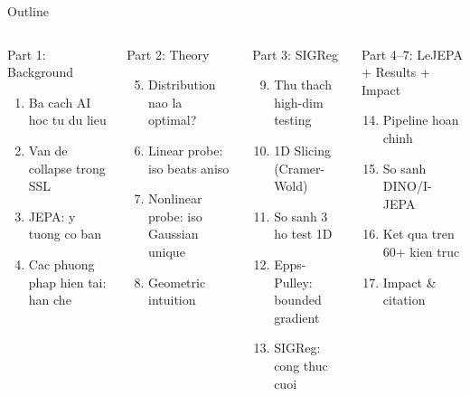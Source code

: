 \documentclass[aspectratio=169,12pt]{beamer}
\begin{document}
\begin{frame}{Outline}
\begin{columns}[t]
\begin{block}{Part 1: Background}
\begin{enumerate}\small
  \item Ba cach AI hoc tu du lieu
  \item Van de collapse trong SSL
  \item JEPA: y tuong co ban
  \item Cac phuong phap hien tai: han che
\end{enumerate}
\end{block}
\vspace{6pt}
\begin{block}{Part 2: Theory}
\begin{enumerate}\setcounter{enumi}{4}\small
  \item Distribution nao la optimal?
  \item Linear probe: iso beats aniso
  \item Nonlinear probe: iso Gaussian unique
  \item Geometric intuition
\end{enumerate}
\end{block}

\begin{block}{Part 3: SIGReg}
\begin{enumerate}\setcounter{enumi}{8}\small
  \item Thu thach high-dim testing
  \item 1D Slicing (Cramer-Wold)
  \item So sanh 3 ho test 1D
  \item Epps-Pulley: bounded gradient
  \item SIGReg: cong thuc cuoi
\end{enumerate}
\end{block}
\vspace{6pt}
\begin{block}{Part 4--7: LeJEPA + Results + Impact}
\begin{enumerate}\setcounter{enumi}{13}\small
  \item Pipeline hoan chinh
  \item So sanh DINO/I-JEPA
  \item Ket qua tren 60+ kien truc
  \item Impact \& citation
\end{enumerate}
\end{block}
\end{columns}
\end{frame}
\end{document}
